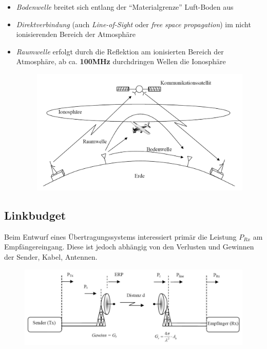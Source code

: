 \documentclass[
  10pt,
  a4paper,
  german]{article}
\numberwithin{equation}{section}
\begin{document}
\begin{itemize}
\item
  \emph{Bodenwelle} breitet sich entlang der ``Materialgrenze''
  Luft-Boden aus
\item
  \emph{Direktverbindung} (auch \emph{Line-of-Sight} oder \emph{free
  space propagation}) im nicht ionisierenden Bereich der Atmosphäre
\item
  \emph{Raumwelle} erfolgt durch die Reflektion am ionisierten Bereich
  der Atmosphäre, ab ca. \textbf{100MHz} durchdringen Wellen die
  Ionosphäre

  \begin{figure}[H]

  {\centering \includegraphics{images/04_AusbreitungVonRadiowellen.png}

  }

  \end{figure}
\end{itemize}

\hypertarget{linkbudget}{%
\subsection{Linkbudget}\label{linkbudget}}

Beim Entwurf eines Übertragungssystems interessiert primär die Leistung
\(P_{Rx}\) am Empfängereingang. Diese ist jedoch abhängig von den
Verlusten und Gewinnen der Sender, Kabel, Antennen.

\begin{figure}[H]

{\centering \includegraphics{images/04_DrahtloseUebertragung.png}

}

\end{figure}
\end{document}
